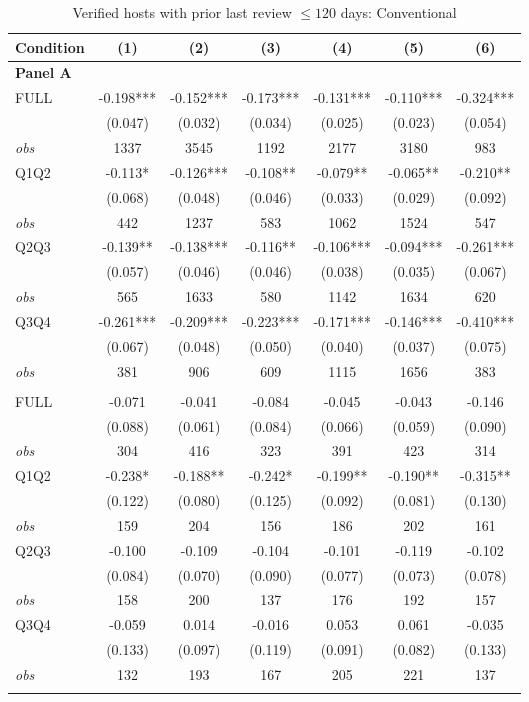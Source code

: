 \begin{table}[!htbp]
\centering
\caption{Verified hosts with prior last review $\leq120$ days: Conventional}
\begin{tabular}{lcccccc}
\toprule
Condition & (1) & (2) & (3) & (4) & (5) & (6) \\
\midrule
\multicolumn{7}{l}{\textbf{Panel A}} \\

FULL & -0.198*** & -0.152*** & -0.173*** & -0.131*** & -0.110*** & -0.324*** \\
 & (0.047) & (0.032) & (0.034) & (0.025) & (0.023) & (0.054) \\
\textit{obs} & 1337 & 3545 & 1192 & 2177 & 3180 & 983 \\
Q1Q2 & -0.113* & -0.126*** & -0.108** & -0.079** & -0.065** & -0.210** \\
 & (0.068) & (0.048) & (0.046) & (0.033) & (0.029) & (0.092) \\
\textit{obs} & 442 & 1237 & 583 & 1062 & 1524 & 547 \\
Q2Q3 & -0.139** & -0.138*** & -0.116** & -0.106*** & -0.094*** & -0.261*** \\
 & (0.057) & (0.046) & (0.046) & (0.038) & (0.035) & (0.067) \\
\textit{obs} & 565 & 1633 & 580 & 1142 & 1634 & 620 \\
Q3Q4 & -0.261*** & -0.209*** & -0.223*** & -0.171*** & -0.146*** & -0.410*** \\
 & (0.067) & (0.048) & (0.050) & (0.040) & (0.037) & (0.075) \\
\textit{obs} & 381 & 906 & 609 & 1115 & 1656 & 383 \\
\addlinespace
\multicolumn{7}{l}{\textbf{Panel B}} \\

FULL & -0.071 & -0.041 & -0.084 & -0.045 & -0.043 & -0.146 \\
 & (0.088) & (0.061) & (0.084) & (0.066) & (0.059) & (0.090) \\
\textit{obs} & 304 & 416 & 323 & 391 & 423 & 314 \\
Q1Q2 & -0.238* & -0.188** & -0.242* & -0.199** & -0.190** & -0.315** \\
 & (0.122) & (0.080) & (0.125) & (0.092) & (0.081) & (0.130) \\
\textit{obs} & 159 & 204 & 156 & 186 & 202 & 161 \\
Q2Q3 & -0.100 & -0.109 & -0.104 & -0.101 & -0.119 & -0.102 \\
 & (0.084) & (0.070) & (0.090) & (0.077) & (0.073) & (0.078) \\
\textit{obs} & 158 & 200 & 137 & 176 & 192 & 157 \\
Q3Q4 & -0.059 & 0.014 & -0.016 & 0.053 & 0.061 & -0.035 \\
 & (0.133) & (0.097) & (0.119) & (0.091) & (0.082) & (0.133) \\
\textit{obs} & 132 & 193 & 167 & 205 & 221 & 137 \\
\addlinespace
\multicolumn{7}{l}{\textbf{Panel C}} \\


\end{tabular}
\end{table}
